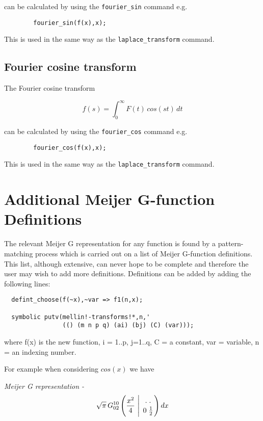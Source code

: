 can be calculated by using the \verb+fourier_sin+ command e.g.
\begin{verbatim}
        fourier_sin(f(x),x);    
\end{verbatim}

This is used in the same way as the \verb+laplace_transform+ command.

\subsection{Fourier cosine transform}

The Fourier cosine transform 

\begin{displaymath}
f(s) = \int_{0}^{\infty} F(t) \,cos (st) \,dt 
\end{displaymath}

can be calculated by using the \verb+fourier_cos+ command e.g.
\begin{verbatim}
        fourier_cos(f(x),x);
\end{verbatim}

This is used in the same way as the \verb+laplace_transform+ command.

\section{Additional Meijer G-function Definitions}

The relevant Meijer G representation for any function is found by a 
pattern-matching process which is carried out on a list of Meijer 
G-function definitions. This list, although extensive, can never hope 
to be complete and therefore the user may wish to add more definitions.
Definitions can be added by adding the following lines:

\begin{verbatim}
  defint_choose(f(~x),~var => f1(n,x);

  symbolic putv(mellin!-transforms!*,n,'
                (() (m n p q) (ai) (bj) (C) (var)));

\end{verbatim} 
     where f(x) is the new function, i = 1..p, j=1..q, C = a constant,
     var = variable, n = an indexing number.

For example when considering $cos (x)$ we have

\it Meijer G representation  -  
\begin{displaymath}
\sqrt{\pi} \,G^{1 0}_{0 2}\left(\frac{x^{2}}{4} \ \Bigg\vert 
\ { . \; . \atop 0 \; \frac{1}{2}} \right) dx 
\end{displaymath}

